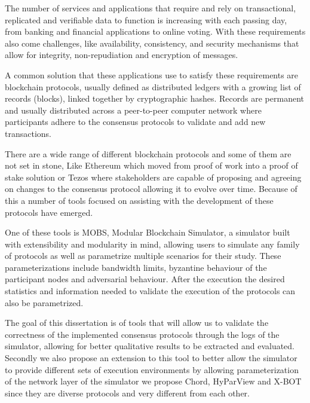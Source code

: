
%

The number of services and applications that require and rely on transactional, replicated and verifiable data to 
function is increasing with each passing day, from banking and financial applications to online voting. With these
requirements also come challenges, like availability, consistency, and security mechanisms that allow for integrity, non-repudiation and
encryption of messages.

A common solution that these applications use to satisfy these requirements are blockchain protocols, usually defined as
distributed ledgers with a growing list of records (blocks), linked together by cryptographic hashes. Records are permanent and
usually distributed across a peer-to-peer computer network where participants adhere to the consensus protocols to validate and add
new transactions.

There are a wide range of different blockchain protocols and some of them are not set in stone, Like Ethereum which moved from proof of work
into a proof of stake solution or Tezos where stakeholders are capable of proposing and agreeing on changes to the consensus protocol allowing
it to evolve over time. Because of this a number of tools focused on assisting with the development of these protocols have emerged.

One of these tools is MOBS, Modular Blockchain Simulator, a simulator built with extensibility and
modularity in mind, allowing users to simulate any family of protocols as well as parametrize multiple scenarios for their study.
These parameterizations include bandwidth limits, byzantine behaviour of the participant nodes and adversarial behaviour. After the execution
the desired statistics and information needed to validate the execution of the protocols can also be parametrized.

The goal of this dissertation is of tools that will allow us to validate the correctness 
of the implemented consensus protocols through the logs of the simulator, allowing for better qualitative results to be extracted and evaluated.
Secondly we also propose an extension to this tool to better allow the simulator to provide different sets of execution environments by
allowing parameterization of the network layer of the simulator we propose Chord, HyParView and X-BOT since they are diverse protocols and very different from each other.


